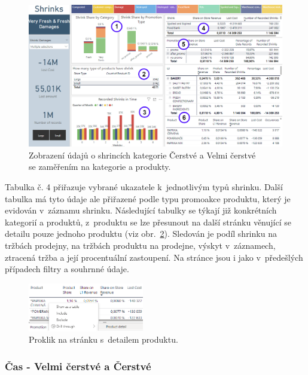 \begin{figure}[h!]
    \centering
    \captionsetup{justification=centering}
    \includegraphics[width=\textwidth]{obrazky/PBI/levelsSFF.png}
    \caption{Zobrazení údajů o shrincích kategorie Čerstvé a Velmi čerstvé \\ se zaměřením na kategorie a produkty.}
    \label{obr:PBI:storesSFF}
\end{figure}

Tabulka č. 4 přiřazuje vybrané ukazatele k~jednotlivým typů shrinku. Další tabulka má tyto údaje ale přiřazené podle typu promoakce produktu, který je evidován v~záznamu shrinku. Následující tabulky se týkají již konkrétních kategorií a produktů, z~produktu se lze přesunout na další stránku věnující se detailu pouze jednoho produktu (viz obr.~\ref*{obr:PBI:drilldetail}). Sledován je podíl shrinku na tržbách prodejny, na tržbách produktu na prodejne, výskyt v~záznamech, ztracená tržba a její procentuální zastoupení. Na stránce jsou i jako v~předešlých případech filtry a souhrnné údaje.

\begin{figure}[h!]
    \centering
    \captionsetup{justification=centering}
    \includegraphics[width=0.45\textwidth]{obrazky/PBI/detaildrill.png}
    \caption{Proklik na stránku s~detailem produktu.}
    \label{obr:PBI:drilldetail}
\end{figure}

\subsubsection*{Čas - Velmi čerstvé a Čerstvé}

